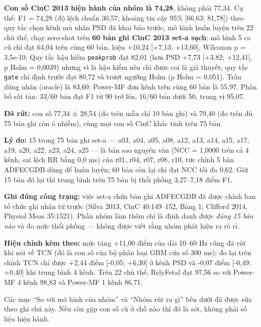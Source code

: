 \documentclass[12pt,a4paper]{article}
\begin{document}
\begin{canhbao}[title={Ghi chú hiệu chỉnh (12/09/2026, vòng 7)}]\small\justifying
\textbf{Con số CinC 2013 hiện hành của nhóm là 74,28}, không phải 77,34. Cụ thể: F1 = 74,28 (độ lệch chuẩn 30,57; khoảng tin cậy 95\% [66,63; 81,78]) theo quy tắc chọn kênh mù nhãn PSD đã khai báo trước, mô hình huấn luyện trên 22 chủ thể, chạy zero-shot trên \textbf{60 bản ghi CinC 2013 set-a sạch}; mô hình 5 ca cũ chỉ đạt 64,04 trên cùng 60 bản, hiệu +10,24 [+7,13; +13,60], Wilcoxon p = 3,5e-10. Quy tắc hậu kiểm \texttt{peakprob} đạt 82,01 (hơn PSD +7,73 [+3,82; +12,41], p Holm = 0,0039) nhưng vì là hậu kiểm nên chỉ được coi là giả thuyết; quy tắc \texttt{gate} chỉ định trước đạt 80,72 và trượt ngưỡng Holm (p Holm = 0,051). Trần dùng nhãn (oracle) là 83,60; Power-MF đơn kênh trên cùng 60 bản là 55,97. Phân bố rất tản: 33/60 bản đạt F1 từ 90 trở lên, 16/60 bản dưới 50, trung vị 95,07.

\textbf{Đã rút:} con số 77,34 ± 28,54 (đo trên mẫu chỉ 10 bản ghi) và 79,40 (đo trên đủ 75 bản ghi còn ô nhiễm), cùng mọi con số CinC khác tính trên 75 bản.

\textbf{Lý do:} 15 trong 75 bản ghi set-a --- a03, a04, a05, a08, a12, a13, a14, a15, a17, a19, a20, a22, a23, a24, a25 --- là bản sao nguyên văn (NCC = 1,0000 trên cả 4 kênh, sai lệch RR bằng 0,0 ms) của r01, r04, r07, r08, r10, tức chính 5 bản ADFECGDB dùng để huấn luyện; 60 bản còn lại chỉ đạt NCC tối đa 0,62. Giữ 15 bản đó lại thì trung bình trên 75 bản bị thổi phồng 3,27--7,18 điểm F1.

\textbf{Ghi đúng công trạng:} việc set-a chứa bản ghi ADFECGDB đã được chính ban tổ chức ghi nhận từ trước (Silva 2013, CinC 40:149--152, Bảng 1; Clifford 2014, Physiol Meas 35:1521). Phần nhóm làm thêm chỉ là định danh được \emph{đúng 15 bản nào} và đo mức thổi phồng --- không được viết rằng nhóm phát hiện ra rò rỉ.

\textbf{Hiệu chỉnh kèm theo:} mức tăng +11,00 điểm của dải 10--60 Hz cũng đã rút khi nói về TCN (đó là con số của bộ phân loại GBM cửa sổ 300 ms); đo lại trên chính TCN chỉ được +2,44 điểm [-0,05; +6,30] ở kênh PSD và -0,07 điểm [-0,49; +0,40] khi trung bình 4 kênh. Trên 22 chủ thể, RelyFetal đạt 97,56 so với Power-MF 4 kênh 98,83 và Power-MF 1 kênh 86,71.

Các mục ``So với mô hình của nhóm'' và ``Nhóm rút ra gì'' bên dưới đã được sửa theo ghi chú này. Nếu còn gặp con số cũ ở chỗ nào thì đó là sót, không phải số liệu hiện hành.
\end{canhbao}
\vspace{6pt}
\end{document}
